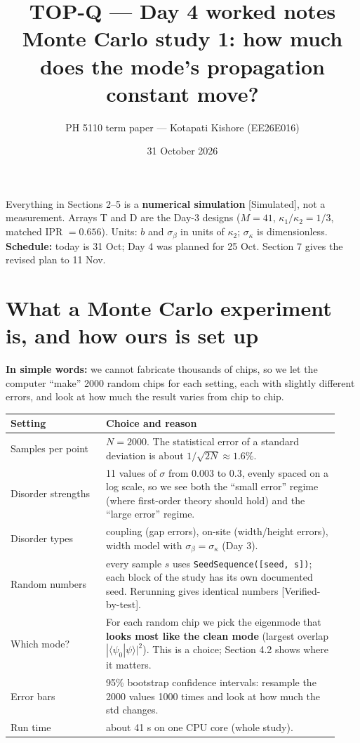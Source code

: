 \documentclass[10pt,a4paper]{article}
\title{TOP-Q --- Day 4 worked notes\\[2pt]\large Monte Carlo study 1: how much does the mode's propagation constant move?}
\author{PH 5110 term paper --- Kotapati Kishore (EE26E016)}
\date{31 October 2026}
\newcommand{\kc}{\kappa_2}
\newcommand{\ka}{\kappa_1}
\newcommand{\note}[1]{\par\smallskip\noindent\colorbox{gray!12}{\parbox{\dimexpr\linewidth-2\fboxsep}{\small #1}}\par\smallskip}
\newcommand{\evd}[1]{\textsf{\small[#1]}}
\newcommand{\simple}[1]{\par\noindent\textbf{In simple words:} #1\par\smallskip}
\begin{document}
\sloppy\maketitle

\note{Everything in Sections 2--5 is a \textbf{numerical simulation} \evd{Simulated}, not a measurement. Arrays T and D are the Day-3 designs ($M=41$, $\ka/\kc=1/3$, matched IPR $=0.656$). Units: $b$ and $\sigma_\beta$ in units of $\kc$; $\sigma_\kappa$ is dimensionless.\\
\textbf{Schedule:} today is 31 Oct; Day 4 was planned for 25 Oct. Section 7 gives the revised plan to 11 Nov.}

\tableofcontents

\section{What a Monte Carlo experiment is, and how ours is set up}
\simple{we cannot fabricate thousands of chips, so we let the computer ``make'' 2000 random chips for each setting, each with slightly different errors, and look at how much the result varies from chip to chip.}

\begin{tabular}{@{}p{0.27\linewidth}p{0.66\linewidth}@{}}\toprule
Setting & Choice and reason\\\midrule
Samples per point & $N=2000$. The statistical error of a standard deviation is about $1/\sqrt{2N}\approx1.6\%$.\\
Disorder strengths & 11 values of $\sigma$ from 0.003 to 0.3, evenly spaced on a log scale, so we see both the ``small error'' regime (where first-order theory should hold) and the ``large error'' regime.\\
Disorder types & coupling (gap errors), on-site (width/height errors), width model with $\sigma_\beta=\sigma_\kappa$ (Day 3).\\
Random numbers & every sample $s$ uses \texttt{SeedSequence([seed, s])}; each block of the study has its own documented seed. Rerunning gives identical numbers \evd{Verified-by-test}.\\
Which mode? & For each random chip we pick the eigenmode that \textbf{looks most like the clean mode} (largest overlap $|\langle\psi_0|\psi\rangle|^2$). This is a choice; Section 4.2 shows where it matters.\\
Error bars & 95\% bootstrap confidence intervals: resample the 2000 values 1000 times and look at how much the std changes.\\
Run time & about 41 s on one CPU core (whole study).\\\bottomrule
\end{tabular}
\end{document}
